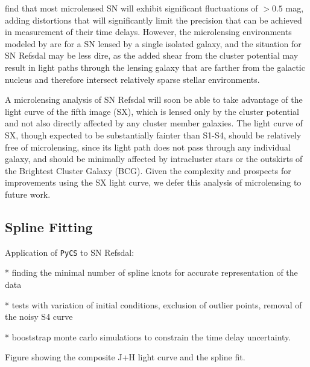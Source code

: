 \citet{Dobler:2006} find that most microlensed SN will exhibit significant fluctuations of $>0.5$ mag, adding distortions that will significantly limit the precision that can be achieved in measurement of their time delays.  However, the microlensing environments modeled by \citep{Dobler:2006} are for a SN lensed by a single isolated galaxy, and the situation for SN Refsdal may be less dire, as the added shear from the  cluster potential may result in light paths through the lensing galaxy that are farther from the galactic nucleus and therefore intersect relatively sparse stellar environments.  

A microlensing analysis of SN Refsdal will soon be able to take advantage of the light curve of the fifth image (SX), which is lensed only by the  cluster potential and not also directly affected by any cluster member galaxies.  The light curve of SX, though expected to be substantially fainter than S1-S4, should be relatively free of microlensing, since its light path does not pass through any individual galaxy, and should be minimally affected by intracluster stars or the outskirts of the  Brightest Cluster Galaxy (BCG).  Given the complexity and prospects for improvements using the SX light curve, we defer this analysis of microlensing to future work.  

\subsection{\pycs Spline Fitting}\label{sec:PycsSplineFitting}

Application of {\tt PyCS} to SN Refsdal: 

 * finding the minimal number of spline knots for accurate representation of the data

 * tests with variation of initial conditions, exclusion of outlier points, removal of the noisy S4 curve

 * booststrap monte carlo simulations to constrain the time delay uncertainty.
 
Figure showing the composite J+H light curve and the spline fit. 



